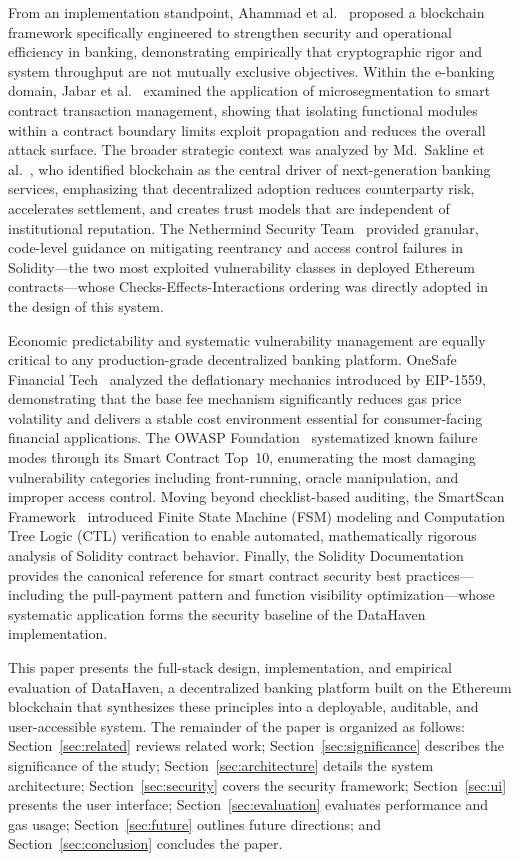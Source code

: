 \documentclass[conference]{IEEEtran}
\begin{document}
From an implementation standpoint, Ahammad et al.~\cite{ref6} proposed a
blockchain framework specifically engineered to strengthen security and
operational efficiency in banking, demonstrating empirically that cryptographic
rigor and system throughput are not mutually exclusive objectives. Within the
e-banking domain, Jabar et al.~\cite{ref7} examined the application of
microsegmentation to smart contract transaction management, showing that
isolating functional modules within a contract boundary limits exploit
propagation and reduces the overall attack surface. The broader strategic
context was analyzed by Md.~Sakline et al.~\cite{ref8}, who identified
blockchain as the central driver of next-generation banking services,
emphasizing that decentralized adoption reduces counterparty risk, accelerates
settlement, and creates trust models that are independent of institutional
reputation. The Nethermind Security Team~\cite{ref9} provided granular,
code-level guidance on mitigating reentrancy and access control failures in
Solidity—the two most exploited vulnerability classes in deployed Ethereum
contracts—whose Checks-Effects-Interactions ordering was directly adopted in
the design of this system.

Economic predictability and systematic vulnerability management are equally
critical to any production-grade decentralized banking platform. OneSafe
Financial Tech~\cite{ref10} analyzed the deflationary mechanics introduced by
EIP-1559, demonstrating that the base fee mechanism significantly reduces gas
price volatility and delivers a stable cost environment essential for
consumer-facing financial applications. The OWASP Foundation~\cite{ref11}
systematized known failure modes through its Smart Contract Top~10, enumerating
the most damaging vulnerability categories including front-running, oracle
manipulation, and improper access control. Moving beyond checklist-based
auditing, the SmartScan Framework~\cite{ref12} introduced Finite State Machine
(FSM) modeling and Computation Tree Logic (CTL) verification to enable
automated, mathematically rigorous analysis of Solidity contract behavior.
Finally, the Solidity Documentation~\cite{ref13} provides the canonical
reference for smart contract security best practices—including the pull-payment
pattern and function visibility optimization—whose systematic application forms
the security baseline of the DataHaven implementation.

This paper presents the full-stack design, implementation, and empirical
evaluation of DataHaven, a decentralized banking platform built on the Ethereum
blockchain that synthesizes these principles into a deployable, auditable, and
user-accessible system. The remainder of the paper is organized as follows:
Section~\ref{sec:related} reviews related work; Section~\ref{sec:significance}
describes the significance of the study; Section~\ref{sec:architecture} details
the system architecture; Section~\ref{sec:security} covers the security
framework; Section~\ref{sec:ui} presents the user interface; Section~\ref{sec:evaluation}
evaluates performance and gas usage; Section~\ref{sec:future} outlines future
directions; and Section~\ref{sec:conclusion} concludes the paper.
\end{document}
